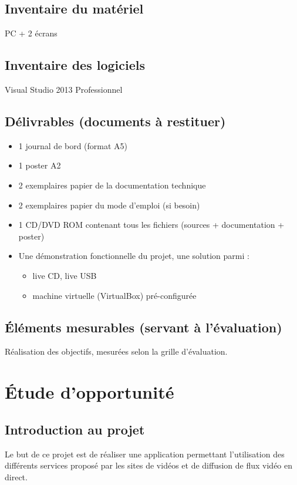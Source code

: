 \documentclass[11pt]{report} %
\begin{document}
	\section{Inventaire du matériel}
	PC + 2 écrans

	\section{Inventaire des logiciels}
	Visual Studio 2013 Professionnel
	
	\section{Délivrables (documents à restituer)}
	\begin{itemize}
		\item 1 journal de bord (format A5)
		\item 1 poster A2
		\item 2 exemplaires papier de la documentation technique
		\item 2 exemplaires papier du mode d'emploi (si besoin)
		\item 1 CD/DVD ROM contenant tous les fichiers (sources + documentation + poster)
		\item Une démonstration fonctionnelle du projet, une solution parmi :
		\begin{itemize}
			\item live CD, live USB
			\item machine virtuelle (VirtualBox) pré-configurée
		\end{itemize}
	\end{itemize}

	\section{Éléments mesurables (servant à l'évaluation)}
	Réalisation des objectifs, mesurées selon la grille d'évaluation.

\chapter{Étude d'opportunité}
\newpage

	\section{Introduction au projet}
	Le but de ce projet est de réaliser une application permettant l'utilisation des différents services proposé par les sites de vidéos et de diffusion de flux vidéo en direct.
\end{document}
